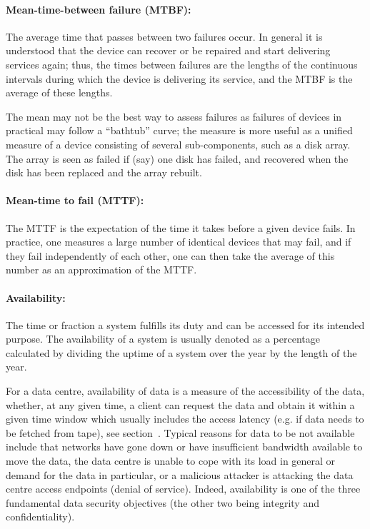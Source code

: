 \paragraph{Mean-time-between failure (MTBF):}
The average time that passes between two failures occur.  In general it is understood that the device can recover or be
repaired and start delivering services again; thus, the times between failures are the lengths of the continuous
intervals during which the device is delivering its service, and the MTBF is the average of these lengths.

The mean may not be the best way to assess failures as failures of devices in practical may follow a ``bathtub'' curve;
the measure is more useful as a unified measure of a device consisting of several sub-components, such as a disk array.
The array is seen as failed if (say) one disk has failed, and recovered when the disk has been replaced and the array
rebuilt.



\paragraph{Mean-time to fail (MTTF):}
The MTTF is the expectation of the time it takes before a given device fails.  In practice, one measures a large number
of identical devices that may fail, and if they fail independently of each other, one can then take the average of
this number as an approximation of the MTTF.

\paragraph{Availability:}
The time or fraction a system fulfills its duty and can be accessed for its intended purpose.
The availability of a system is usually denoted as a percentage calculated by
dividing the uptime of a system over the year by the length of the year.

For a data centre, availability of data is a measure of the accessibility of the data, whether, at any given time, a
client can request the data and obtain it within a given time window which usually includes the access latency (e.g. if
data needs to be fetched from tape), see section~.  Typical reasons for data to be not available
include that networks have gone down or have insufficient bandwidth available to move the data, the data centre is
unable to cope with its load in general or demand for the data in particular, or a malicious attacker is attacking the
data centre access endpoints (denial of service).  Indeed, availability is one of the three fundamental data security
objectives (the other two being integrity and confidentiality).

